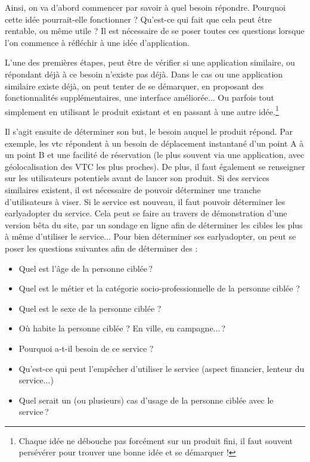 Ainsi, on va d'abord commencer par savoir à quel besoin répondre. Pourquoi cette idée pourrait-elle fonctionner ? Qu'est-ce qui fait que cela peut être rentable, ou même utile ? Il est nécessaire de se poser toutes ces questions lorsque l'on commence à réfléchir à une idée d'application.

L'une des premières étapes, peut être de vérifier si une application similaire, ou répondant déjà à ce besoin n'existe pas déjà. Dans le cas ou une application similaire existe déjà, on peut tenter de se démarquer, en proposant des fonctionnalités supplémentaires, une interface améliorée... Ou parfois tout simplement en utilisant le produit existant et en passant à une autre idée.\footnote{Chaque idée ne débouche pas forcément sur un produit fini, il faut souvent persévérer pour trouver une bonne idée et se démarquer !}

Il s'agit ensuite de déterminer son but, le besoin auquel le produit répond. Par exemple, les \gls{vtc} répondent à un besoin de déplacement instantané d'un point A à un point B et une facilité de réservation (le plus souvent via une application, avec géolocalisation des VTC les plus proches). De plus, il faut également se renseigner sur les utilisateurs potentiels avant de lancer son produit. Si des services similaires existent, il est nécessaire de pouvoir déterminer une tranche d'utilisateurs à viser. Si le service est nouveau, il faut pouvoir déterminer les \gls{earlyadopter} du service. Cela peut se faire au travers de démonstration d'une version bêta du site, par un sondage en ligne afin de déterminer les cibles les plus à même d'utiliser le service... Pour bien déterminer ses \gls{earlyadopter}, on peut se poser les questions suivantes afin de déterminer des  :

\begin{itemize}
	\setlength\itemsep{-0.5em}
	\item Quel est l'âge de la personne ciblée ?
	\item Quel est le métier et la catégorie socio-professionnelle de la personne ciblée ?
	\item Quel est le sexe de la personne ciblée ? 
	\item Où habite la personne ciblée ? En ville, en campagne... ? 
	\item Pourquoi a-t-il besoin de ce service ? 
	\item Qu'est-ce qui peut l'empêcher d'utiliser le service (aspect financier, lenteur du service...) 
	\item Quel serait un (ou plusieurs) cas d'usage de la personne ciblée avec le service ?
\end{itemize}

